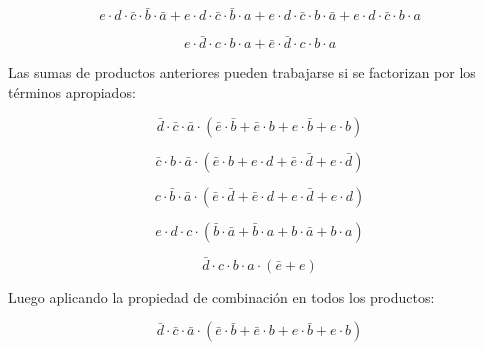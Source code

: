 \begin{equation}
e \cdot d \cdot \bar{c} \cdot \bar{b} \cdot \bar{a} +              %
e \cdot d \cdot \bar{c} \cdot \bar{b} \cdot a +                    %
e \cdot d \cdot \bar{c} \cdot b \cdot \bar{a} + 	                  %
e \cdot d \cdot \bar{c} \cdot b \cdot a                           %
\end{equation}

\begin{equation}
e \cdot \bar{d} \cdot c \cdot b \cdot a +                          %
\bar{e} \cdot \bar{d} \cdot c \cdot b \cdot a  			          %
\end{equation}

Las sumas de productos anteriores pueden trabajarse si se factorizan por los términos apropiados:

\begin{equation}\label{eq:minterm_0_2_16_18}
\bar{d} \cdot \bar{c} \cdot \bar{a} \cdot (\bar{e} \cdot \bar{b} + \bar{e} \cdot b + e \cdot \bar{b} + e \cdot b)
\end{equation}

\begin{equation}\label{eq:mintem_10_26_2_18}
\bar{c} \cdot b \cdot \bar{a} \cdot (\bar{e} \cdot b + e 	\cdot d + \bar{e} \cdot \bar{d} + e \cdot \bar{d})
\end{equation}

\begin{equation}\label{eq:minterm_4_12_20_28}
c \cdot \bar{b} \cdot \bar{a} \cdot (\bar{e} \cdot \bar{d} + \bar{e} \cdot d + e \cdot \bar{d} + e \cdot d)
\end{equation}

\begin{equation}\label{eq:minterm_24_25_26_27}
e \cdot d \cdot c \cdot (\bar{b} \cdot \bar{a} + \bar{b} \cdot a + b \cdot \bar{a} + b \cdot a)
\end{equation}

\begin{equation}\label{eq:minterm_/_23}
\bar{d} \cdot c \cdot b \cdot a \cdot (\bar{e} + e)
\end{equation}

Luego aplicando la propiedad de combinación en todos los productos:

\begin{equation}\label{eq:minterm_0_2_16_18}
\bar{d} \cdot \bar{c} \cdot \bar{a} \cdot (\bar{e} \cdot \bar{b} + \bar{e} \cdot b + e \cdot \bar{b} + e \cdot b)
\end{equation}

